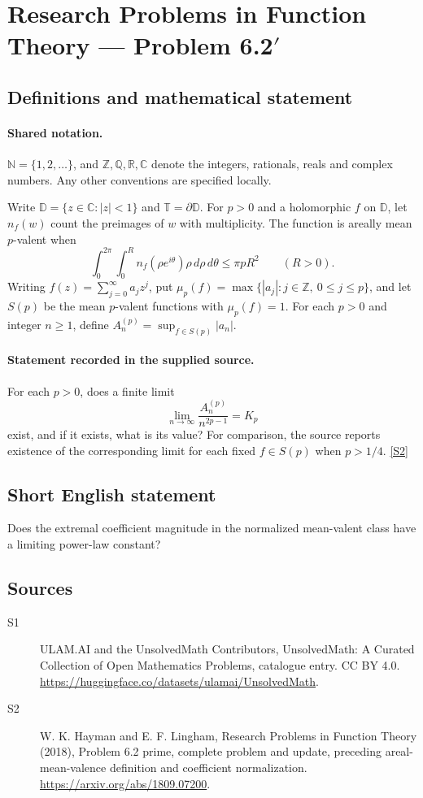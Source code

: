 \documentclass[11pt]{article}
\newcommand{\sref}[2]{\hyperlink{source:#1:#2}{[S#2]}}
\begin{document}
\section{Research Problems in Function Theory — Problem 6.2$\prime$}\label{statement}

\subsection{Definitions and mathematical statement}

\paragraph{Shared notation.}$\mathbb N=\{1,2,\ldots\}$, and $\mathbb Z,\mathbb Q,\mathbb R,\mathbb C$ denote the integers, rationals, reals and complex numbers. Any other conventions are specified locally.


Write $\mathbb D=\{z\in\mathbb C:|z|<1\}$ and $\mathbb T=\partial\mathbb D$. For $p>0$ and a holomorphic $f$ on $\mathbb D$, let $n_f(w)$ count the preimages of $w$ with multiplicity. The function is areally mean $p$-valent when
\[\int_0^{2\pi}\int_0^R n_f(\rho e^{i\theta})\rho\,d\rho\,d\theta\leq\pi pR^2\qquad(R>0).\]
Writing $f(z)=\sum_{j=0}^{\infty}a_jz^j$, put $\mu_p(f)=\max\{|a_j|:j\in\mathbb Z,\ 0\leq j\leq p\}$, and let $S(p)$ be the mean $p$-valent functions with $\mu_p(f)=1$.
For each $p>0$ and integer $n\geq1$, define $A_n^{(p)}=\sup_{f\in S(p)}|a_n|$.
\paragraph{Statement recorded in the supplied source.}
For each $p>0$, does a finite limit
\[\lim_{n\to\infty}\frac{A_n^{(p)}}{n^{2p-1}}=K_p\]
exist, and if it exists, what is its value? For comparison, the source reports existence of the corresponding limit for each fixed $f\in S(p)$ when $p>1/4$. \sref{statement}{2}
\subsection{Short English statement}
Does the extremal coefficient magnitude in the normalized mean-valent class have a limiting power-law constant?
\subsection{Sources}
\begin{description}
\item[\hypertarget{source:statement:1}{S1}] ULAM.AI and the UnsolvedMath Contributors, UnsolvedMath: A Curated Collection of Open Mathematics Problems, catalogue entry. CC BY 4.0. \url{https://huggingface.co/datasets/ulamai/UnsolvedMath}.
\item[\hypertarget{source:statement:2}{S2}] W. K. Hayman and E. F. Lingham, Research Problems in Function Theory (2018), Problem 6.2 prime, complete problem and update, preceding areal-mean-valence definition and coefficient normalization. \url{https://arxiv.org/abs/1809.07200}.
\end{description}
\label{end:statement}
\end{document}
